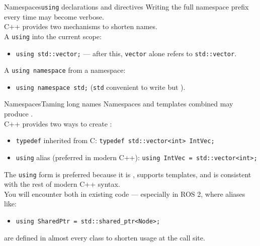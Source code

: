 \begin{frame}{Namespaces}{\texttt{using} declarations and directives}
	\justifying
	Writing the full namespace prefix every time may become verbose.\\
	C++ provides two mechanisms to shorten names.\\
	\bigskip
	A \texttt{using}  into the current scope:
	\begin{itemize}
		\item \texttt{using std::vector;} — after this, \texttt{vector} alone refers to \texttt{std::vector}.
	\end{itemize}
	\bigskip
	A \texttt{using namespace}  from a namespace:
	\begin{itemize}
		\item \texttt{using namespace std;} (\texttt{std} convenient to write but ).
	\end{itemize}
\end{frame}
\begin{frame}{Namespaces}{Taming long names}
	\justifying
	Namespaces and templates combined may produce .\\
	C++ provides two ways to create :
	\begin{itemize}
		\item \texttt{typedef} inherited from C: \texttt{typedef std::vector<int> IntVec;}
		\item \texttt{using} alias (preferred in modern C++): \texttt{using IntVec = std::vector<int>;}
	\end{itemize}
	\bigskip
	The \texttt{using} form is preferred because it is , supports templates, and is consistent with the rest of modern C++ syntax.\\
	\bigskip
	You will encounter both in existing code — especially in ROS 2, where aliases like:
	\begin{itemize}
		\item \texttt{using SharedPtr = std::shared\_ptr<Node>;}
	\end{itemize}
	are defined in almost every class to shorten usage at the call site.
\end{frame}
